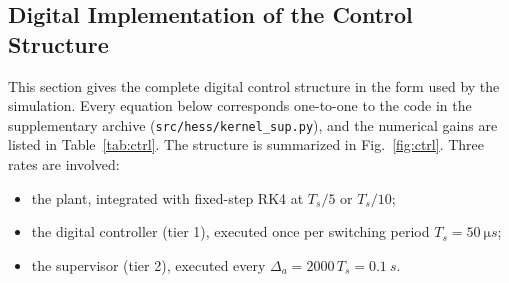 \subsection{Digital Implementation of the Control Structure}\label{sec:impl}

This section gives the complete digital control structure in the form used by the simulation. Every equation below corresponds one-to-one to the code in the supplementary archive (\texttt{src/hess/kernel\_sup.py}), and the numerical gains are listed in Table~\ref{tab:ctrl}. The structure is summarized in Fig.~\ref{fig:ctrl}. Three rates are involved:
\begin{itemize}
\item the plant, integrated with fixed-step RK4 at $T_s/5$ or $T_s/10$;
\item the digital controller (tier 1), executed once per switching period $T_s=\SI{50}{\micro s}$;
\item the supervisor (tier 2), executed every $\Delta_a=2000\,T_s=\SI{0.1}{s}$.
\end{itemize}

